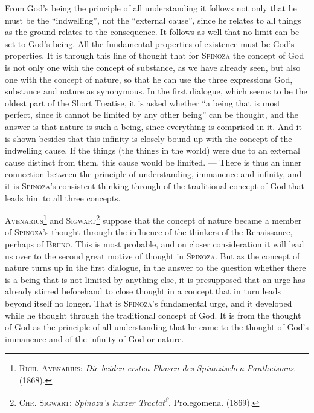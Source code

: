 \documentclass[12pt]{article}
\newcommand{\opage}[1]{\marginnote{\footnotesize\textit{[#1]}}}
\begin{document}
From God's being the principle of all understanding it follows not only that he
must be the ``indwelling'', not the ``external cause'', since he relates to all
things as the ground relates to the consequence. It follows as well that no limit
can be set to God's being. All the fundamental properties of existence must be
God's properties. It is through this line of thought that for \textsc{Spinoza}
the concept of God is not only one with the concept of substance, as we have
already seen, but also one with the concept of nature, so that he can use the
three expressions God, substance and nature as synonymous. In the first dialogue,
which seems to be the oldest part of the Short Treatise, it is asked whether ``a
being that is most perfect, since it cannot be limited by any other being'' can
be thought, and the answer is that nature is such a being, since everything is
comprised in it. And it is shown besides that this infinity is closely bound up
with the concept of the indwelling cause. If the things (the things in the world)
were due to an external cause distinct from them, this cause would be limited.
--- There is thus an inner connection between the principle of understanding,
immanence and infinity, and it is \textsc{Spinoza}'s consistent thinking through
of the traditional concept of God that leads him to all three concepts.

\opage{8}\textsc{Avenarius}\footnote{\textsc{Rich. Avenarius}: \textit{Die beiden
ersten Phasen des Spinozischen Pantheismus}. (1868).} and
\textsc{Sigwart}\footnote{\textsc{Chr. Sigwart}: \textit{Spinoza's kurzer
Tractat\textsuperscript{2}}. Prolegomena. (1869).} suppose that the concept of
nature became a member of \textsc{Spinoza}'s thought through the influence of the
thinkers of the Renaissance, perhaps of \textsc{Bruno}. This is most probable, and
on closer consideration it will lead us over to the second great motive of thought
in \textsc{Spinoza}. %
But as the concept of nature turns up in the first dialogue, in the answer to the
question whether there is a being that is not limited by anything else, it is
presupposed that an urge has already stirred beforehand to close thought in a
concept that in turn leads beyond itself no longer. That is \textsc{Spinoza}'s
fundamental urge, and it developed while he thought through the traditional
concept of God. It is from the thought of God as the principle of all
understanding that he came to the thought of God's immanence and of the infinity
of God or nature.
\end{document}

